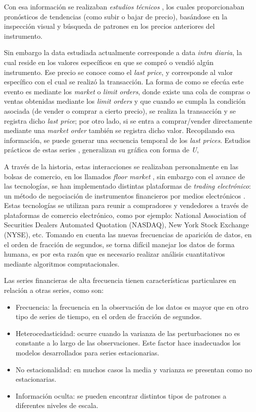 Con esa información se realizaban \emph{estudios técnicos}
\cite{taylor1992use}, los cuales proporcionaban pronósticos de tendencias (como
subir o bajar de precio), basándose en la inspección visual y búsqueda de
patrones en los precios anteriores del instrumento. 

Sin embargo la data estudiada actualmente corresponde a data \emph{intra
diaria}, la cual reside en los valores específicos en que se compró o vendió
algún instrumento.  Ese precio se conoce como el \emph{last price}, y
corresponde al valor específico con el cual se realizó la transacción. La forma
de como se efecúa este evento es mediante los \emph{market} o \emph{limit
orders}, donde existe una cola de compras o ventas obtenidas mediante los
\emph{limit orders} y que cuando se cumpla la condición asociada (de vender o
comprar a cierto precio), se realiza la transacción y se registra dicho
\emph{last price}; por otro lado, si se entra a comprar/vender directamente
mediante una \emph{market order} también se registra dicho valor. Recopilando
esa información, se puede generar una secuencia temporal de los \emph{last
prices}. Estudios prácticos de estas series \cite{biais2012empirical},
generalizan su gráfica con forma de \emph{U},

A través de la historia, estas interacciones se realizaban personalmente en las
bolsas de comercio, en los llamados \emph{floor market}
\cite{jain2005financial}, sin embargo con el avance de las tecnologías, se han
implementado distintas plataformas de \emph{trading electrónico}: un método de
negociación de instrumentos financieros por medios electrónicos
\cite{weston2002electronic}. Estas tecnologías se utilizan para reunir a
compradores y vendedores a través de plataformas de comercio electrónico, como
por ejemplo: National Association of Securities Dealers Automated Quotation
(NASDAQ), New York Stock Exchange (NYSE), etc. Tomando en cuenta las nuevas
frecuencias de aparición de datos, en el orden de fracción de segundos, se
torna difícil manejar los datos de forma humana, es por esta razón que es
necesario realizar análisis cuantitativos mediante algoritmos computacionales.

Las series financieras de alta frecuencia tienen características particulares
en relación a otras series, como son: 
\begin{itemize}
	\item Frecuencia: la frecuencia en la observación de los datos es mayor que
en otro tipo de series de tiempo, en el orden de fracción de segundos.
	\item Heterocedasticidad: ocurre cuando la varianza de las perturbaciones
no es constante a lo largo de las observaciones.  Este factor hace inadecuados
los modelos desarrollados para series estacionarias.
	\item No estacionalidad: en muchos casos la media y varianza se presentan
como no estacionarias.
	\item Información oculta: se pueden encontrar distintos tipos de patrones a
diferentes niveles de escala.
\end{itemize}

